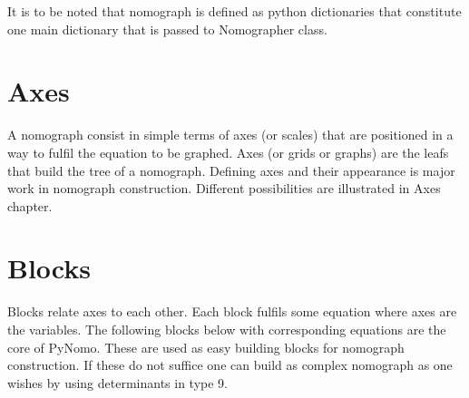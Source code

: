 \documentclass[a4paper,11pt,english]{sphinxmanual}
\begin{document}
It is to be noted that nomograph is defined as python dictionaries that
constitute one main dictionary that is passed to Nomographer class.


\section{Axes}
\label{main_page:axes}
A nomograph consist in simple terms of axes (or scales) that are positioned in a way to fulfil the equation to be graphed.
Axes (or grids or graphs) are the leafs that build the tree of a nomograph.
Defining axes and their appearance is major work in nomograph
construction. Different possibilities are illustrated in Axes chapter.


\section{Blocks}
\label{main_page:blocks}
Blocks relate axes to each other. Each block fulfils some equation where axes are the variables.
The following blocks below with corresponding equations are the core of PyNomo.
These are used as easy
building blocks for nomograph construction. If these do not suffice one
can build as complex nomograph as one wishes by using determinants in type 9.
\end{document}
